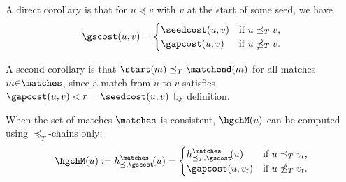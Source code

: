 A direct corollary is that for $u\preceq v$ with $v$ at the start of some seed, we
have
\begin{equation}
  \gscost(u,v) =
  \begin{cases}
    \seedcost(u,v) & \text{if $u\preceq_T v$,}\\
    \gapcost(u,v) & \text{if $u\npreceq_T v$.}
\end{cases}
\label{eq:trans}
\end{equation}

A second corollary is that ${\start(m) \preceq_T \matchend(m)}$ for all matches
$m {\in} \matches$, since a match from $u$ to $v$ satisfies
$\gapcost(u,v) < r = \seedcost(u,v)$ by definition.


\begin{lem}\label{lem:tchain} %
  When the set of matches $\matches$ is consistent, $\hgchM(u)$ can be computed
  using \mbox{$\preceq_T$-chains} only:
  \begin{equation*}
    \hgchM(u)
    := h^\matches_{\preceq,\gscost}\!(u)
      = \begin{cases}
           h^\matches_{\preceq_T,\gscost}\!(u) & \text{if $u \preceq_T v_t$,} \\
           \gapcost(u, v_t) & \text{if $u\npreceq_T v_t$.}
         \end{cases}
    \label{eq:tchain}
  \end{equation*}
\end{lem}

